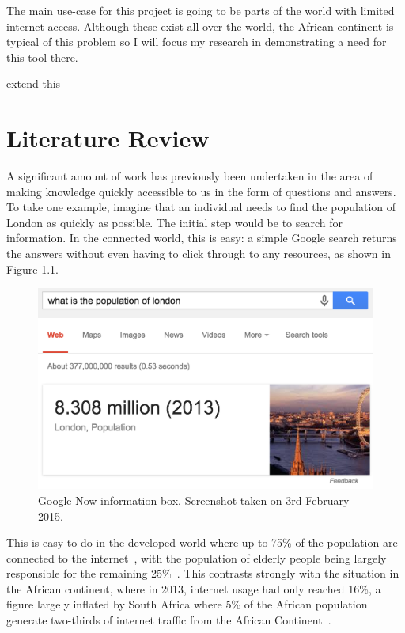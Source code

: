 \documentclass[authoryearcitations]{UoYCSproject}
\begin{document}
The main use-case for this project is going to be parts of the world with limited internet access.  Although these exist all over the world, the African continent is typical of this problem so I will focus my research in demonstrating a need for this tool there.

{\color{red} extend this}

\newpage

\chapter{Literature Review}
\label{sec:literatureReview}

A significant amount of work has previously been undertaken in the area of making knowledge quickly accessible to us in the form of questions and answers.  To take one example, imagine that an individual needs to find the population of London as quickly as possible.  The initial step would be to search for information.  In the connected world, this is easy: a simple Google search returns the answers without even having to click through to any resources, as shown in Figure \ref{fig:googleInstant}.

\begin{figure}[htb] 
\includegraphics[width=\linewidth]{googleInstant}
\caption{Google Now information box.  Screenshot taken on 3rd February 2015.}
\label{fig:googleInstant}
\end{figure}

This is easy to do in the developed world where up to 75\% of the population are connected to the internet~\cite{ITU_Cell_Usage_2013}, with the population of elderly people being largely responsible for the remaining 25\%~\cite{Gov_Internet_Usage_UK_2014}.  This contrasts strongly with the situation in the African continent, where in 2013, internet usage had only reached 16\%, a figure largely inflated by South Africa where 5\% of the African population generate two-thirds of internet traffic from the African Continent~\cite{ITU_Cell_Usage_2013}.
\end{document}
